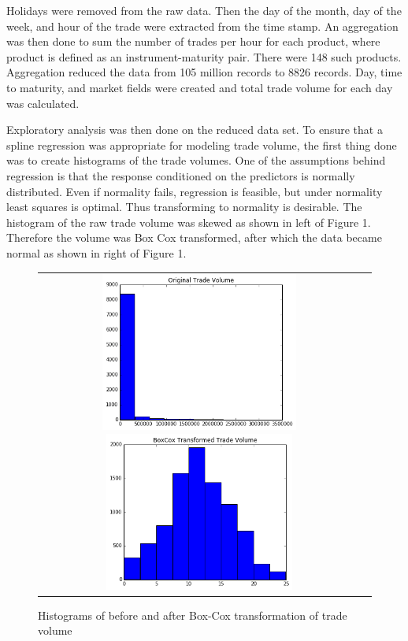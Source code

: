 \documentclass[12pt]{article}
\begin{document}
Holidays were removed from the raw data. Then the day of the month, day of the week, and hour of the trade were extracted from the time stamp. An aggregation was then done to sum the number of trades per hour for each product, where product is defined as an instrument-maturity pair. There were 148 such products. Aggregation reduced the data from 105 million records to 8826 records. Day, time to maturity, and market fields were created and total trade volume for each day was calculated.

Exploratory analysis was then done on the reduced data set. To ensure that a spline regression was appropriate for modeling trade volume, the first thing done was to create histograms of the trade volumes. One of the assumptions behind regression is that the response conditioned on the predictors is normally distributed. Even if normality fails, regression is feasible, but under normality least squares is optimal. Thus transforming to normality is desirable. The histogram of the raw trade volume was skewed as shown in left of Figure 1. Therefore the volume was Box Cox transformed, after which the data became normal as shown in right of Figure 1.

\begin{figure}[H]
	\begin{center}
	\begin{tabular}{cc}
		\includegraphics[width=6.5cm]{hist_orig.png}
		\includegraphics[width=6.25cm]{hist_bc.png}
	\end{tabular}
	\caption{Histograms of before and after Box-Cox transformation of trade volume}
	\label{fig:dum1}
	\end{center}
\end{figure}
\end{document}
